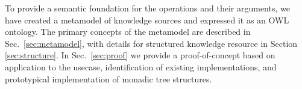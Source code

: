 \documentclass[runningheads]{llncs}
\begin{document}
To provide a semantic foundation for the operations and their arguments, we have created a metamodel of knowledge sources and expressed it as an OWL ontology\cite{Ontology}.
The primary concepts  of the metamodel are described in Sec.~\ref{sec:metamodel}, with details for structured knowledge resource in Section \ref{sec:structure}.
In Sec.~\ref{sec:proof} we provide a proof-of-concept based on application to the usecase, identification of existing implementations, and prototypical implementation of monadic tree structures.


\end{document}
